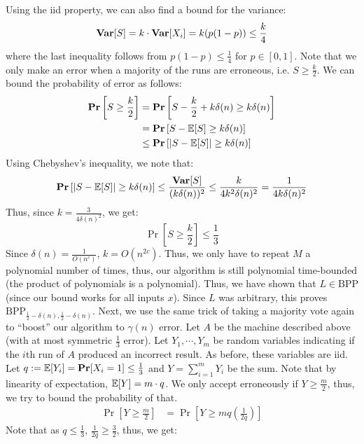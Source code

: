 \documentclass[12pt]{article}
\begin{document}
\begin{solution}
    Using the iid property, we can also find a bound for the variance: 
    \[ \operatorname{\mathbf{Var}}[S] = k\cdot \operatorname{\mathbf{Var}}[X_i] = k(p(1-p)) \leq \frac{k}{4} \]
    where the last inequality follows from $p(1-p) \leq \frac{1}{4}$ for $p \in [0, 1]$. \bbni
    Note that we only make an error when a majority of the runs are erroneous, i.e. $S \geq \frac{k}{2}$. We can bound the probability of error as follows: 
    \begin{align*}
        \operatorname{\mathbf{Pr}}\left[S \geq \frac{k}{2}\right] &= \operatorname{\mathbf{Pr}}\left[S-\frac{k}{2}+k\delta(n) \geq k\delta(n)\right]  \\
        &= \operatorname{\mathbf{Pr}}\left[S-\operatorname{\mathbb{E}}[S] \geq k\delta(n)\right] \\
        &\leq \operatorname{\mathbf{Pr}}\left[|S-\operatorname{\mathbb{E}}[S]| \geq k \delta(n)\right]
    \end{align*}
    Using Chebyshev's inequality, we note that: 
    \begin{align*}
        \operatorname{\mathbf{Pr}}\left[|S-\operatorname{\mathbb{E}}[S]| \geq k \delta(n)\right] \leq \frac{\operatorname{\mathbf{Var}}[S]}{(k\delta(n))^2} \leq \frac{k}{4k^2\delta(n)^2} = \frac{1}{4k\delta(n)^2}
    \end{align*}
    Thus, since $k = \frac{3}{4\delta(n)^2}$, we get: 
    \[ \Pr\left[S \geq \frac{k}{2} \right] \leq \frac{1}{3}\]
    Since $\delta(n) = \frac{1}{O(n^c)}$, $k = O(n^{2c})$. Thus, we only have to repeat $M$ a polynomial number of times, thus, our algorithm is still polynomial time-bounded (the product of polynomials is a polynomial). Thus, we have shown that $L \in \text{BPP}$ (since our bound works for all inputs $x$). Since $L$ was arbitrary, this proves $\text{BPP}_{\frac{1}{2}-\delta(n), \frac{1}{2}-\delta(n)}$. \bbni
    Next, we use the same trick of taking a majority vote again to ``boost'' our algorithm to $\gamma(n)$ error.\bbni  
    Let $A$ be the machine described above (with at most symmetric $\frac{1}{3}$ error). Let $Y_1, \cdots, Y_m$ be random variables indicating if the $i$th run of $A$ produced an incorrect result. As before, these variables are iid. Let $q := \operatorname{\mathbb{E}}[Y_i] = \operatorname{\mathbf{Pr}}[X_i = 1] \leq \frac{1}{3}$ and $Y = \sum_{i=1}^m Y_i$ be the sum. Note that by linearity of expectation, $\operatorname{\mathbb{E}}[Y] = m \cdot q$. We only accept erroneously if $Y \geq \frac{m}{2}$, thus, we try to bound the probability of that. 
    \begin{align*}
        \Pr\left[Y \geq \frac{m}{2}\right] &= \Pr\left[Y \geq mq\left(\frac{1}{2q}\right)\right]
    \end{align*}
    Note that as $q \leq \frac{1}{3}$, $\frac{1}{2q} \geq \frac{3}{2}$, thus, we get: 
    \begin{align*}

\end{align*}
\end{solution}
\end{document}
